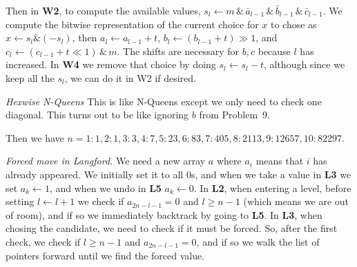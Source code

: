 Then in {\bf W2}, to compute the available values,
$s_l \leftarrow m \,\&\, {\bar a_{l-1}} \,\&\, {\bar b_{l-1}} \,\&\, {\bar c_{l-1}}$.
We compute the bitwise representation of the current choice for $x$ to chose as
$x \leftarrow s_l \& \left(- s_l\right)$, then $a_l \leftarrow a_{l-1} + t$,
$b_l \leftarrow \left(b_{l-1} + t\right) \gg 1$, and 
$c_l \leftarrow \left( {c_{l-1} + t} \ll 1 \right) \,\&\, m$.  The shifts are 
necessary for $b, c$ because $l$ has increased.  In {\bf W4} we
remove that choice by doing $s_l \leftarrow s_l - t$, although since we keep
all the $s_l$, we can do it in W2 if desired.

 {\it Hexwise N-Queens}\hfil\break
This is like N-Queens except we only need to check one diagonal.  This turns out
to be like ignoring $b$ from Problem~9.

Then we have $n=1: 1, 2: 1, 3: 3, 4: 7, 5: 23, 6: 83, 7: 405, 8: 2113, 9: 12657,
10: 82297$.

 {\it Forced move in Langford.}\hfil\break
We need a new array $a$ where $a_i$ means that $i$ has already appeared.
We initially set it to all 0s, and when we take a value in {\bf L3}
we set $a_k \leftarrow 1$, and when we undo in {\bf L5} $a_k \leftarrow 0$.
In {\bf L2}, when entering a level, before setting $l \leftarrow l+1$
we check if $a_{2n-l-1} = 0$ and $l \ge n-1$ (which means we are out
of room), and if so we immediately backtrack by going to {\bf L5}.
In {\bf L3}, when chosing the candidate, we need to check if it must be forced.
So, after the first check, we check if $l \ge n-1$ and $a_{2n-l-1} = 0$, and if so we
walk the list of pointers forward until we find the forced value.
\bye